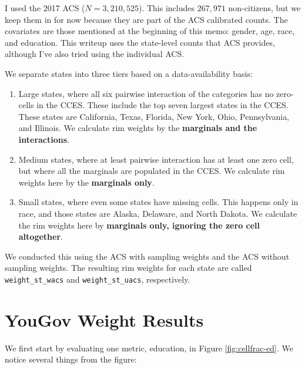 \documentclass[11pt]{article}
\begin{document}
I used the 2017 ACS (\(N = 3,210,525\)). This includes \(267,971\) non-citizens, but we keep them in for now because they are part of the ACS calibrated counts. The covariates are those mentioned at the beginning of this memo: gender, age, race, and education. This writeup uses the state-level counts that ACS provides, although I've also tried using the individual ACS.


We separate states into three tiers based on a data-availability basis:
\begin{enumerate}
    \item Large states, where all six pairwise interaction of the categories has no zero-cells in the CCES. These include the top seven largest states in the CCES. These states are California, Texas, Florida, New York, Ohio, Pennsylvania, and Illinois. We calculate rim weights by the \textbf{marginals and the interactions}.
    \item Medium states, where at least pairwise interaction has at least one zero cell, but where all the marginals are populated in the CCES. We calculate rim weights here by the \textbf{marginals only}.
    \item Small states, where even some states have missing cells. This happens only in race, and those states are Alaska, Delaware, and North Dakota. We calculate the rim weights here by \textbf{marginals only, ignoring the zero cell altogether}.
\end{enumerate}


We conducted this using the ACS with sampling weights and the ACS without sampling weights. The resulting rim weights for each state are called \texttt{weight\_st\_wacs} and \texttt{weight\_st\_uacs}, respectively.



\newpage

\section{YouGov Weight Results \label{sec:res-yougov}}

We first start by evaluating one metric, education, in Figure \ref{fig:cellfrac-ed}. We notice several things from the figure:

\smallskip
\end{document}
